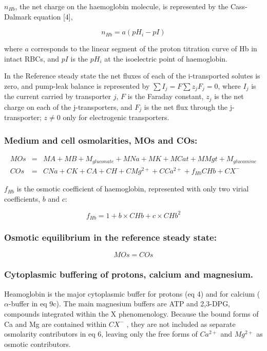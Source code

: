 \documentclass[a4paper]{article}
\newcommand{\med}[1]{M#1}
\newcommand{\cell}[1]{C#1}
\newcommand{\MA}{\med{A}}
\newcommand{\MB}{\med{B}}
\newcommand{\MGluca}{M_{glucamine}}
\newcommand{\MNa}{\med{Na}}
\newcommand{\MK}{\med{K}}
\newcommand{\MGluco}{M_{gluconate}}
\newcommand{\MOs}{\med{Os}}
\newcommand{\MCat}{\med{Cat}}
\newcommand{\MMgt}{\med{Mgt}}
\newcommand{\CNa}{\cell{Na}}
\newcommand{\CK}{\cell{K}}
\newcommand{\CH}{\cell{H}}
\newcommand{\CMgtp}{\cell{Mg^{2+}}}
\newcommand{\CCatp}{\cell{Ca^{2+}}}
\newcommand{\CA}{\cell{A}}
\newcommand{\nHb}{n_{Hb}}
\newcommand{\CHb}{\cell{Hb}}
\newcommand{\CXm}{\cell{X^{-}}}
\newcommand{\COs}{\cell{Os}}
\newcommand{\pH}[1]{pH_{#1}}
\newcommand{\pI}{pI}
\newcommand{\fHb}{f_{Hb}}
\begin{document}
$\nHb$, the net charge on the haemoglobin molecule, is represented by the Cass-Dalmark equation [4],

\begin{equation}
\nHb=  a(\pH{i} - \pI)
\end{equation}

where $a$ corresponds to the linear segment of the proton titration curve of Hb in intact RBCs, and $\pI$ is the $\pH{i}$ at the isoelectric point of haemoglobin.

In the Reference steady state the net fluxes of each of the i-transported solutes is zero, and pump-leak balance is represented by $\sum I_j = F\sum z_jF_j = 0$, where $I_j$ is the current carried by transporter $j$, $F$ is the Faraday constant, $z_j$ is the net charge on each of the j-transporters, and $F_j$ is the net flux through the j-transporter; $z \neq 0$ only for electrogenic transporters. 

\subsubsection{Medium and cell osmolarities, MOs and COs:}

\begin{eqnarray}
	\MOs &=& \MA + \MB + \MGluco + \MNa + \MK + \MCat + \MMgt + \MGluca\\
	\COs &=& \CNa + \CK + \CA + \CH + \CMgtp + \CCatp  + \fHb\CHb + \CXm
\end{eqnarray}

$\fHb$ is the osmotic coefficient of haemoglobin, represented with only two virial coefficients, $b$ and $c$:

\begin{equation}
\fHb = 1 + b\times\CHb + c\times\CHb^2 
\end{equation}

\subsubsection{Osmotic equilibrium in the reference steady state:}

\begin{equation}
\MOs = \COs
\end{equation}

\subsubsection{Cytoplasmic buffering of protons, calcium and magnesium.}
Heamoglobin is the major cytoplasmic buffer for protons (eq 4) and for calcium ($\alpha$-buffer in eq 9c).  The main magnesium buffers are ATP and 2,3-DPG, compounds integrated within the X  phenomenology.  Because the bound forms of Ca and Mg are contained within $CX^-$ , they are not included as separate osmolarity contributors in eq 6, leaving only the free forms of $Ca^{2+}$ and $Mg^{2+}$ as osmotic contributors.  
\end{document}
